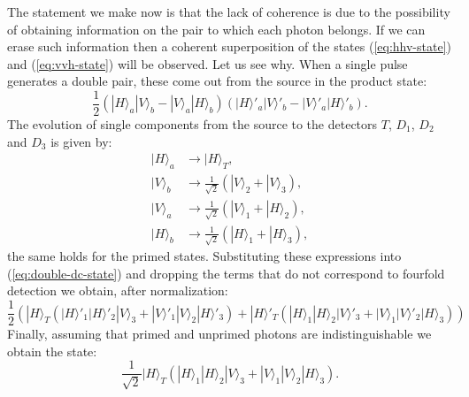 The statement we make now is that the lack of coherence is due to the possibility of obtaining information on the pair to which each photon belongs. If we can erase such information then a coherent superposition of the states (\ref{eq:hhv-state}) and (\ref{eq:vvh-state}) will be observed. Let us see why. When a single pulse generates a double pair, these come out from the source in the product state:
\begin{equation}
  \frac{1}{2} \left( |H\rangle_a |V\rangle_b - |V\rangle_a |H\rangle_b \right) \left( |H\rangle'_a |V\rangle'_b - |V\rangle'_a |H\rangle'_b \right).
  \label{eq:double-dc-state}
\end{equation}
The evolution of single components from the source to the detectors $T$, $D_1$, $D_2$ and $D_3$ is given by:
\begin{equation}
  \begin{split}
    |H\rangle_a &\rightarrow |H\rangle_T,\\
    |V\rangle_b &\rightarrow \frac{1}{\sqrt{2}} \left( |V\rangle_2 + |V\rangle_3 \right),\\
    |V\rangle_a &\rightarrow \frac{1}{\sqrt{2}} \left( |V\rangle_1 + |H\rangle_2 \right),\\
    |H\rangle_b &\rightarrow \frac{1}{\sqrt{2}} \left( |H\rangle_1 + |H\rangle_3 \right),
  \end{split}
  \label{eq:single-components-evolution}
\end{equation}
the same holds for the primed states. Substituting these expressions into (\ref{eq:double-dc-state}) and dropping the terms that do not correspond to fourfold detection we obtain, after normalization:
\begin{equation*}
    \frac{1}{2} \left( |H\rangle_T \left( |H\rangle'_1 |H\rangle'_2 |V\rangle_3 + |V\rangle'_1 |V\rangle_2 |H\rangle'_3 \right) + |H\rangle'_T \left( |H\rangle_1 |H\rangle_2 |V\rangle'_3 + |V\rangle_1 |V\rangle'_2 |H\rangle_3 \right) \right)
\end{equation*}
Finally, assuming that primed and unprimed photons are indistinguishable we obtain the state:%
\begin{equation}
  \frac{1}{\sqrt{2}} |H\rangle_T \left( |H\rangle_1 |H\rangle_2 |V\rangle_3 + |V\rangle_1 |V\rangle_2 |H\rangle_3 \right).
  \label{eq:trigger+hv-ghz-state}
\end{equation}

